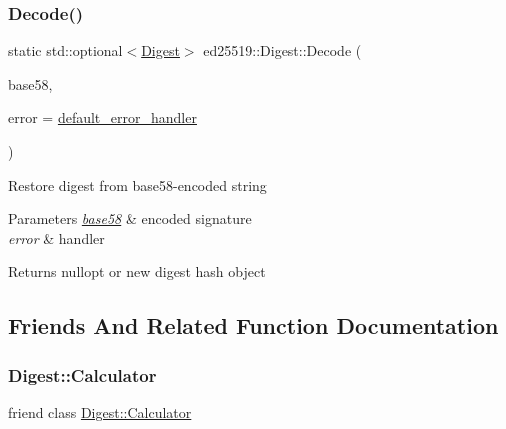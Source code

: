 \subsubsection{\texorpdfstring{Decode()}{Decode()}}
{\footnotesize\ttfamily static std\+::optional$<$\mbox{\hyperlink{classed25519_1_1_digest}{Digest}}$>$ ed25519\+::\+Digest\+::\+Decode (\begin{DoxyParamCaption}\item[{const std\+::string \&}]{base58,  }\item[{const \mbox{\hyperlink{namespaceed25519_a6ba572942b3c18591fc869d52a6b16e6}{Error\+Handler}} \&}]{error = {\ttfamily \mbox{\hyperlink{namespaceed25519_a7c7bb6ed17541162959c33ed3e3b15fb}{default\+\_\+error\+\_\+handler}}} }\end{DoxyParamCaption})\hspace{0.3cm}{\ttfamily [static]}}

Restore digest from base58-\/encoded string 
\begin{DoxyParams}{Parameters}
{\em \mbox{\hyperlink{namespaceed25519_1_1base58}{base58}}} & encoded signature \\
\hline
{\em error} & handler \\
\hline
\end{DoxyParams}
\begin{DoxyReturn}{Returns}
nullopt or new digest hash object 
\end{DoxyReturn}


\subsection{Friends And Related Function Documentation}
\mbox{\label{classed25519_1_1_digest_a27f0effdfdf5c477d7471486da0e67a6}} 
\subsubsection{\texorpdfstring{Digest::Calculator}{Digest::Calculator}}
{\footnotesize\ttfamily friend class \mbox{\hyperlink{structed25519_1_1_digest_1_1_calculator}{Digest\+::\+Calculator}}\hspace{0.3cm}{\ttfamily [friend]}}

\mbox{\label{classed25519_1_1_digest_aeb2790f4039920f65160ef1e580122be}} 
